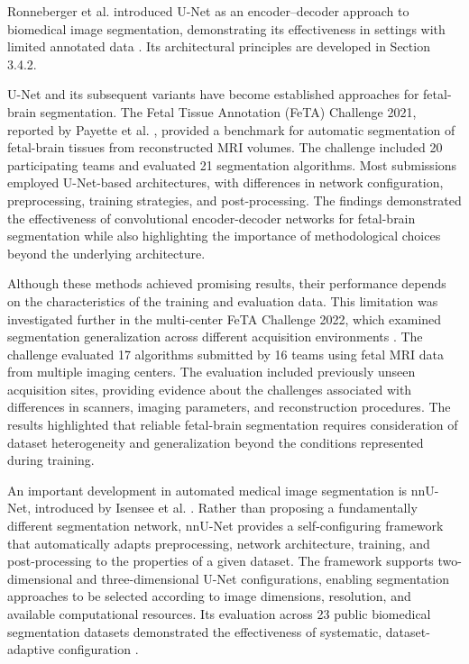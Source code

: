 Ronneberger et al. introduced U-Net as an encoder--decoder approach to biomedical image segmentation, demonstrating its effectiveness in settings with limited annotated data \autocite{ronneberger2015unet}. Its architectural principles are developed in Section 3.4.2.

U-Net and its subsequent variants have become established approaches for fetal-brain segmentation. The Fetal Tissue Annotation (FeTA) Challenge 2021, reported by Payette et al. \autocite{payette2023feta}, provided a benchmark for automatic segmentation of fetal-brain tissues from reconstructed MRI volumes. The challenge included 20 participating teams and evaluated 21 segmentation algorithms. Most submissions employed U-Net-based architectures, with differences in network configuration, preprocessing, training strategies, and post-processing. The findings demonstrated the effectiveness of convolutional encoder-decoder networks for fetal-brain segmentation while also highlighting the importance of methodological choices beyond the underlying architecture.

Although these methods achieved promising results, their performance depends on the characteristics of the training and evaluation data. This limitation was investigated further in the multi-center FeTA Challenge 2022, which examined segmentation generalization across different acquisition environments \autocite{payette2025feta}. The challenge evaluated 17 algorithms submitted by 16 teams using fetal MRI data from multiple imaging centers. The evaluation included previously unseen acquisition sites, providing evidence about the challenges associated with differences in scanners, imaging parameters, and reconstruction procedures. The results highlighted that reliable fetal-brain segmentation requires consideration of dataset heterogeneity and generalization beyond the conditions represented during training.

An important development in automated medical image segmentation is nnU-Net, introduced by Isensee et al. \autocite{isensee2021nnunet}. Rather than proposing a fundamentally different segmentation network, nnU-Net provides a self-configuring framework that automatically adapts preprocessing, network architecture, training, and post-processing to the properties of a given dataset. The framework supports two-dimensional and three-dimensional U-Net configurations, enabling segmentation approaches to be selected according to image dimensions, resolution, and available computational resources. Its evaluation across 23 public biomedical segmentation datasets demonstrated the effectiveness of systematic, dataset-adaptive configuration \autocite{isensee2021nnunet}.

